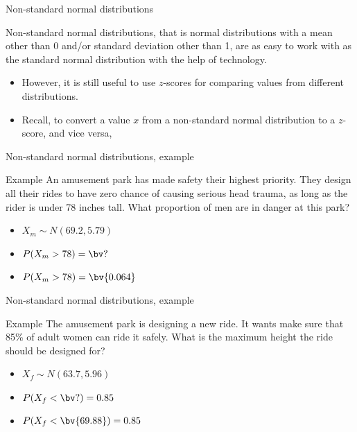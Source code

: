 \documentclass[xcolor=table, aspectratio=169, bigger, handout]{beamer}
\begin{document}
\begin{frame}{Non-standard normal distributions}
\begin{block}{}
Non-standard normal distributions, that is normal distributions with a mean other than 0 and/or standard deviation other than 1, are as easy to work with as the standard normal distribution with the help of technology.
\begin{itemize}
\pause\item However, it is still useful to use $z$-scores for comparing values from different distributions.
\pause\item Recall, to convert a value $x$ from a non-standard normal distribution to a $z$-score, and vice versa,\\ \smallskip
{}
\end{itemize}
\end{block}
\end{frame}


\begin{frame}{Non-standard normal distributions, example}
\begin{exampleblock}{Example}
An amusement park has made safety their highest priority. They design all their rides to have zero chance of causing serious head trauma, as long as the rider is under 78 inches tall. What proportion of men are in danger at this park?
\begin{itemize}
\pause\item $X_m \sim N(69.2, 5.79)$
\pause\item $P(X_m > 78) = \bv ?$
\pause\item $P(X_m > 78) = \bv{0.064}$
\end{itemize}

\end{exampleblock}
\end{frame}

\begin{frame}{Non-standard normal distributions, example}
\begin{exampleblock}{Example}
The amusement park is designing a new ride. It wants make sure that 85\% of adult women can ride it safely. What is the maximum height the ride should be designed for?
\begin{itemize} 
\pause\item $X_f \sim N(63.7, 5.96)$
\pause\item $P(X_f <  \bv ?) = 0.85$
\pause\item $P(X_f <  \bv{69.88}) = 0.85$
\end{itemize}
\end{exampleblock}
\end{frame}
\end{document}
